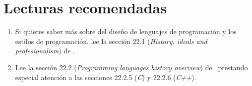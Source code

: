 \section{Lecturas recomendadas}

\begin{enumerate}

\item Si quieres saber más sobre del diseño de lenguajes de programación y 
      los estilos de programación, lee la 
      sección 22.1 (\emph{History, ideals and profesionalism})
      de \pppbook{}.

\item Lee la sección 22.2 (\emph{Programming languages history overview}) 
      de~\pppbook{} prestando especial atención
      a las secciones 22.2.5 (\emph{C}) y 22.2.6 (\emph{C++}).

\end{enumerate}
